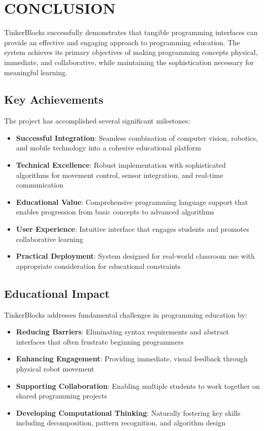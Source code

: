 \chapter{CONCLUSION}

TinkerBlocks successfully demonstrates that tangible programming interfaces can provide an effective and engaging approach to programming education. The system achieves its primary objectives of making programming concepts physical, immediate, and collaborative, while maintaining the sophistication necessary for meaningful learning.

\section{Key Achievements}

The project has accomplished several significant milestones:

\begin{itemize}
    \item \textbf{Successful Integration}: Seamless combination of computer vision, robotics, and mobile technology into a cohesive educational platform
    \item \textbf{Technical Excellence}: Robust implementation with sophisticated algorithms for movement control, sensor integration, and real-time communication
    \item \textbf{Educational Value}: Comprehensive programming language support that enables progression from basic concepts to advanced algorithms
    \item \textbf{User Experience}: Intuitive interface that engages students and promotes collaborative learning
    \item \textbf{Practical Deployment}: System designed for real-world classroom use with appropriate consideration for educational constraints
\end{itemize}

\section{Educational Impact}

TinkerBlocks addresses fundamental challenges in programming education by:
\begin{itemize}
    \item \textbf{Reducing Barriers}: Eliminating syntax requirements and abstract interfaces that often frustrate beginning programmers
    \item \textbf{Enhancing Engagement}: Providing immediate, visual feedback through physical robot movement
    \item \textbf{Supporting Collaboration}: Enabling multiple students to work together on shared programming projects
    \item \textbf{Developing Computational Thinking}: Naturally fostering key skills including decomposition, pattern recognition, and algorithm design
\end{itemize}

